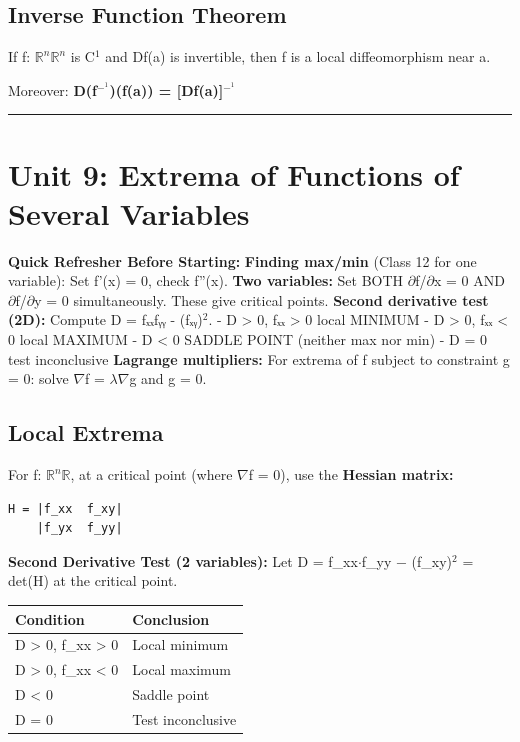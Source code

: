 \documentclass[12pt,a4paper,openany]{book}
\begin{document}
{{\subsection{Inverse Function Theorem }

If f: $\mathbb{R}^n\mathbb{R}^n$ is C$^1$ and Df(a) is invertible, then f is a local diffeomorphism near a.

Moreover: \textbf{D(f$^{-}^1$)(f(a)) = [Df(a)]$^{-}^1$}

\bigskip\noindent\rule{\textwidth}{0.4pt}\bigskip

\section{Unit 9: Extrema of Functions of Several Variables }

\begin{prereqbox}
 \textbf{Quick Refresher Before Starting:}
\textbf{Finding max/min} (Class 12 for one variable): Set f'(x) = 0, check f''(x).
\textbf{Two variables:} Set BOTH $\partial$f/$\partial$x = 0 AND $\partial$f/$\partial$y = 0 simultaneously. These give critical points.
\textbf{Second derivative test (2D):} Compute D = fₓₓfᵧᵧ - (fₓᵧ)$^2$.
- D > 0, fₓₓ > 0  local MINIMUM
- D > 0, fₓₓ < 0  local MAXIMUM
- D < 0  SADDLE POINT (neither max nor min)
- D = 0  test inconclusive
\textbf{Lagrange multipliers:} For extrema of f subject to constraint g = 0: solve $\nabla$f = $\lambda\nabla$g and g = 0.
\end{prereqbox}


\subsection{Local Extrema}

For f: $\mathbb{R}^n\mathbb{R}$, at a critical point (where $\nabla$f = 0), use the \textbf{Hessian matrix:}

\begin{verbatim}
H = |f_xx  f_xy|
    |f_yx  f_yy|
\end{verbatim}

\textbf{Second Derivative Test (2 variables):}
Let D = f_xx$\cdot$f_yy − (f_xy)$^2$ = det(H) at the critical point.

\begin{center}
\begin{tabular}{|l|l|}
\hline
\textbf{Condition} & \textbf{Conclusion} \\
\hline
D > 0, f_xx > 0 & Local minimum \\
\hline
D > 0, f_xx < 0 & Local maximum \\
\hline
D < 0 & Saddle point \\
\hline
D = 0 & Test inconclusive \\
\hline
\end{tabular}
\end{center}

}}
\end{document}
